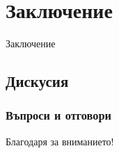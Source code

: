 \documentclass{beamer}
\begin{document}
\section{Заключение}

\begin{frame}
\center \huge{Заключение}
\end{frame}

\subsection{Дискусия}

\begin{frame}
\frametitle{Въпроси и отговори}
\center \huge{Благодаря за вниманието!}
\end{frame}
\end{document}
